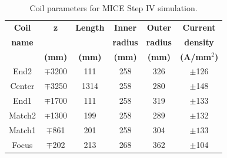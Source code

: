 \documentclass{jacow}
\begin{document}
\begin{table}[!h]
\small
\begin{center}
\caption{Coil parameters for MICE Step IV simulation.}
\begin{tabular}{cccccc}
	\toprule
	\textbf{Coil} & \textbf{z} & \textbf{Length} & \textbf{Inner} & \textbf{Outer} & \textbf{Current}\\
	\textbf{name} & & & \textbf{radius} & \textbf{radius} & \textbf{density}\\
	 & \textbf{(mm)} & \textbf{(mm)} & \textbf{(mm)} & \textbf{(mm)} & \textbf{(A/mm$^2$)}\\
	\midrule
	End2 & $\mp$3200&111&258&326&$\pm$126 \\
	Center&$\mp$3250&1314&258&280&$\pm$148 \\
	End1 & $\mp$1700 & 111& 258 & 319 & $\pm$133 \\
	Match2 & $\mp$1300 & 199 & 258 & 289 & $\pm$132 \\
	Match1 & $\mp$861 & 201 & 258 & 304 & $\pm133$ \\
	Focus & $\mp$202 & 213 & 268 & 362 & $\pm$104 \\
	\bottomrule
\end{tabular}
\label{tbl:coil_parameters}
\end{center}
\end{table}
\end{document}

